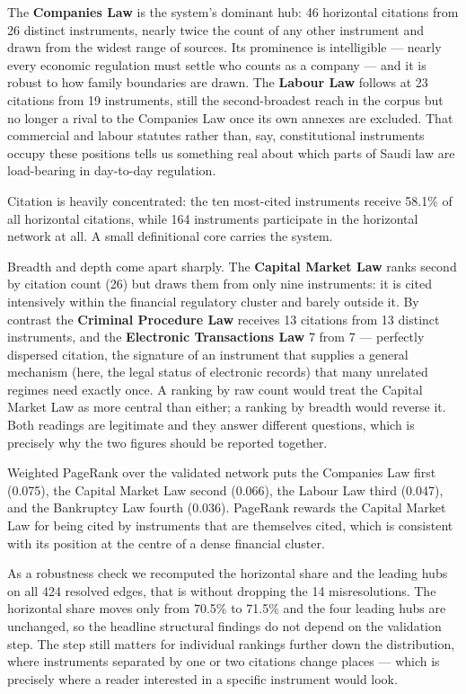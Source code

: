 \documentclass[sn-basic]{sn-jnl}%
\begin{document}
The \textbf{Companies Law} is the system's dominant hub: 46 horizontal
citations from 26 distinct instruments, nearly twice the count of any other
instrument and drawn from the widest range of sources. Its prominence is
intelligible --- nearly every economic regulation must settle who counts as a
company --- and it is robust to how family boundaries are drawn. The
\textbf{Labour Law} follows at 23 citations from 19 instruments, still the
second-broadest reach in the corpus but no longer a rival to the Companies
Law once its own annexes are excluded. That commercial and labour statutes
rather than, say, constitutional instruments occupy these positions tells us
something real about which parts of Saudi law are load-bearing in day-to-day
regulation.

Citation is heavily concentrated: the ten most-cited instruments receive
58.1\% of all horizontal citations, while 164 instruments participate in the
horizontal network at all. A small definitional core carries the system.

Breadth and depth come apart sharply. The \textbf{Capital Market Law} ranks
second by citation count (26) but draws them from only nine instruments: it
is cited intensively within the financial regulatory cluster and barely
outside it. By contrast the \textbf{Criminal Procedure Law} receives 13
citations from 13 distinct instruments, and the \textbf{Electronic
Transactions Law} 7 from 7 --- perfectly dispersed citation, the signature
of an instrument that supplies a general mechanism (here, the legal status
of electronic records) that many unrelated regimes need exactly once. A
ranking by raw count would treat the Capital Market Law as more central than
either; a ranking by breadth would reverse it. Both readings are legitimate
and they answer different questions, which is precisely why the two figures
should be reported together.

Weighted PageRank over the validated network puts the Companies Law first
(0.075), the Capital Market Law second (0.066), the Labour Law third
(0.047), and the Bankruptcy Law fourth (0.036). PageRank rewards the Capital
Market Law for being cited by instruments that are themselves cited, which
is consistent with its position at the centre of a dense financial cluster.

As a robustness check we recomputed the horizontal share and the leading
hubs on all 424 resolved edges, that is without dropping the 14
misresolutions. The horizontal share moves only from 70.5\% to 71.5\% and
the four leading hubs are unchanged, so the headline structural findings do
not depend on the validation step. The step still matters for individual
rankings further down the distribution, where instruments separated by one
or two citations change places --- which is precisely where a reader
interested in a specific instrument would look.
\end{document}
